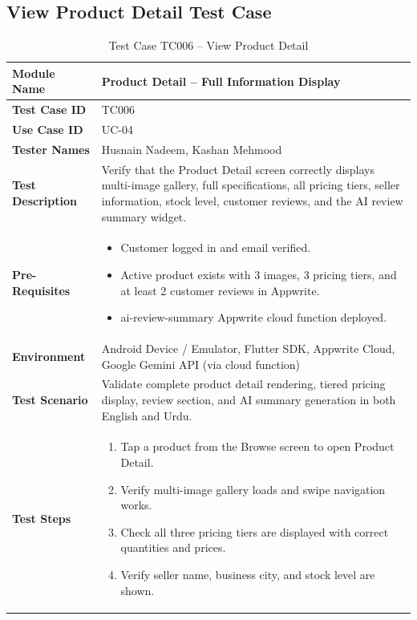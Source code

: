 \subsection{View Product Detail Test Case}
{\renewcommand{\arraystretch}{1.15}
\small
\setlength{\LTleft}{\fill}
\setlength{\LTright}{\fill}
\begin{longtable}{|p{3.2cm}|p{10.8cm}|}
\caption{Test Case TC006 -- View Product Detail} \label{tab:tc006} \\
\hline
\textbf{Module Name} & Product Detail -- Full Information Display \\ \hline
\textbf{Test Case ID} & TC006 \\ \hline
\textbf{Use Case ID} & UC-04 \\ \hline
\textbf{Tester Names} & Husnain Nadeem, Kashan Mehmood \\ \hline
\textbf{Test Description} & Verify that the Product Detail screen correctly displays multi-image gallery, full specifications, all pricing tiers, seller information, stock level, customer reviews, and the AI review summary widget. \\ \hline
\textbf{Pre-Requisites} &
\begin{itemize}[leftmargin=*,noitemsep]
\item Customer logged in and email verified.
\item Active product exists with 3 images, 3 pricing tiers, and at least 2 customer reviews in Appwrite.
\item ai-review-summary Appwrite cloud function deployed.
\end{itemize} \\ \hline
\textbf{Environment} & Android Device / Emulator, Flutter SDK, Appwrite Cloud, Google Gemini API (via cloud function) \\ \hline
\textbf{Test Scenario} & Validate complete product detail rendering, tiered pricing display, review section, and AI summary generation in both English and Urdu. \\ \hline
\textbf{Test Steps} &
\begin{enumerate}[leftmargin=*,noitemsep]
\item Tap a product from the Browse screen to open Product Detail.
\item Verify multi-image gallery loads and swipe navigation works.
\item Check all three pricing tiers are displayed with correct quantities and prices.
\item Verify seller name, business city, and stock level are shown.

\end{enumerate}
\end{longtable}}
